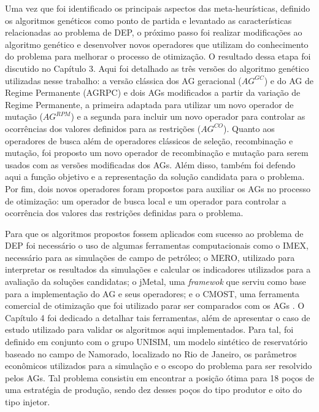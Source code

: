 Uma vez que foi identificado os principais aspectos das meta-heurísticas, definido os algoritmos genéticos como ponto de partida e levantado as características relacionadas ao problema de DEP, o próximo passo foi realizar modificações ao algoritmo genético e desenvolver novos operadores que utilizam do conhecimento do problema para melhorar o processo de otimização. O resultado dessa etapa foi discutido no Capítulo 3. Aqui foi detalhado as três versões do algoritmo genético utilizadas nesse trabalho: a versão clássica dos AG geracional ($AG^{GC}$) e do AG de Regime Permanente (AGRPC) e dois AGs modificados a partir da variação de Regime Permanente, a primeira adaptada para utilizar um novo operador de mutação ($AG^{RPM}$) e a segunda para incluir um novo operador para controlar as ocorrências dos valores definidos para as restrições ($AG^{CO}$). Quanto aos operadores de busca além de operadores clássicos de seleção, recombinação e mutação, foi proposto um novo operador de recombinação e mutação para serem usados com as versões modificadas dos AGs. Além disso, também foi defendo aqui a função objetivo e a representação da solução candidata para o problema. Por fim, dois novos operadores foram propostos para auxiliar os AGs no processo de otimização: um operador de busca local e um operador para controlar a ocorrência dos valores das restrições definidas para o problema.

Para que os algoritmos propostos fossem aplicados com sucesso ao problema de DEP foi necessário o uso de algumas ferramentas computacionais como o IMEX, necessário para as simulações de campo de petróleo; o MERO, utilizado para interpretar os resultados da simulações e calcular os indicadores utilizados para a avaliação da soluções candidatas; o jMetal, uma \textit{framewok} que serviu como base para a implementação do AG e seus operadores; e o CMOST, uma ferramenta comercial de otimização que foi utilizado parar ser comparados com os AGs . O Capítulo 4 foi dedicado a detalhar tais ferramentas, além de apresentar o caso de estudo utilizado para validar os algoritmos aqui implementados. Para tal, foi definido em conjunto com o grupo UNISIM, um modelo sintético de reservatório baseado no campo de Namorado, localizado no Rio de Janeiro, os parâmetros econômicos utilizados para a simulação e o escopo do problema para ser resolvido pelos AGs. Tal problema consistiu em encontrar a posição ótima para 18 poços de uma estratégia de produção, sendo dez desses poços do tipo produtor e oito do tipo injetor.

